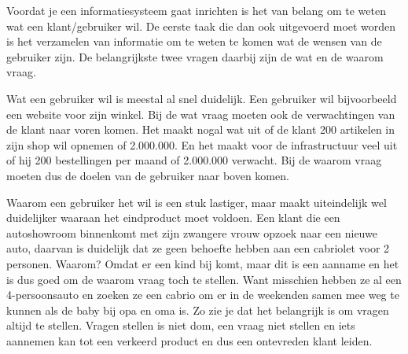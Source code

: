 
Voordat je een informatiesysteem gaat inrichten is het van belang om te weten wat een klant/gebruiker wil. De eerste taak die dan ook uitgevoerd moet worden is het verzamelen van informatie om te weten te komen wat de wensen van de gebruiker zijn. De belangrijkste twee vragen daarbij zijn de wat en de waarom vraag.

Wat een gebruiker wil is meestal al snel duidelijk. Een gebruiker wil bijvoorbeeld een website voor zijn winkel. Bij de wat vraag moeten ook de verwachtingen van de klant naar voren komen. Het maakt nogal wat uit of de klant 200 artikelen in zijn shop wil opnemen of 2.000.000. En het maakt voor de infrastructuur veel uit of hij 200 bestellingen per maand of 2.000.000 verwacht. Bij de waarom vraag moeten dus de doelen van de gebruiker naar boven komen.

Waarom een gebruiker het wil is een stuk lastiger, maar maakt uiteindelijk wel duidelijker waaraan het eindproduct moet voldoen. Een klant die een autoshowroom binnenkomt met zijn zwangere vrouw opzoek naar een nieuwe auto, daarvan is duidelijk dat ze geen behoefte hebben aan een cabriolet voor 2 personen. Waarom? Omdat er een kind bij komt, maar dit is een aanname en het is dus goed om de waarom vraag toch te stellen. Want misschien hebben ze al een 4-persoonsauto en zoeken ze een cabrio om er in de weekenden samen mee weg te kunnen als de baby bij opa en oma is. Zo zie je dat het belangrijk is om vragen altijd te stellen. Vragen stellen is niet dom, een vraag niet stellen en iets aannemen kan tot een verkeerd product en dus een ontevreden klant leiden.

